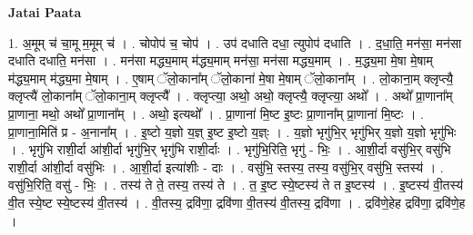 \documentclass[17pt]{extarticle}
\begin{document}
\textbf{Jatai Paata} \newline

1. अ॒मूम् च॑ चा॒मू म॒मूम् च॑ । . चोपोप॑ च॒ चोप॑ । . उप॑ दधाति दधा॒ त्युपोप॑ दधाति । . द॒धा॒ति॒ मन॑सा॒ मन॑सा दधाति दधाति॒ मन॑सा । . मन॑सा मद्ध्य॒माम् म॑द्ध्य॒माम् मन॑सा॒ मन॑सा मद्ध्य॒माम् । . म॒द्ध्य॒मा मे॒षा मे॒षाम् म॑द्ध्य॒माम् म॑द्ध्य॒मा मे॒षाम् । . ए॒षाम् ॅलो॒काना᳚म् ॅलो॒काना॑ मे॒षा मे॒षाम् ॅलो॒काना᳚म् । . लो॒काना॒म् क्लृप्त्यै॒ क्लृप्त्यै॑ लो॒काना᳚म् ॅलो॒काना॒म् क्लृप्त्यै᳚ । . क्लृप्त्या॒ अथो॒ अथो॒ क्लृप्त्यै॒ क्लृप्त्या॒ अथो᳚ । . अथो᳚ प्रा॒णाना᳚म् प्रा॒णाना॒ मथो॒ अथो᳚ प्रा॒णाना᳚म् । . अथो॒ इत्यथो᳚ । . प्रा॒णाना॑ मि॒ष्ट इ॒ष्टः प्रा॒णाना᳚म् प्रा॒णाना॑ मि॒ष्टः । . प्रा॒णाना॒मिति॑ प्र - अ॒नाना᳚म् । . इ॒ष्टो य॒ज्ञो य॒ज्ञ् इ॒ष्ट इ॒ष्टो य॒ज्ञ्ः । . य॒ज्ञो भृगु॑भि॒र् भृगु॑भिर् य॒ज्ञो य॒ज्ञो भृगु॑भिः । . भृगु॑भि राशी॒र्दा आ॑शी॒र्दा भृगु॑भि॒र् भृगु॑भि राशी॒र्दाः । . भृगु॑भि॒रिति॒ भृगु॑ - भिः॒ । . आ॒शी॒र्दा वसु॑भि॒र् वसु॑भि राशी॒र्दा आ॑शी॒र्दा वसु॑भिः । . आ॒शी॒र्दा इत्या॑शीः - दाः । . वसु॑भि॒ स्तस्य॒ तस्य॒ वसु॑भि॒र् वसु॑भि॒ स्तस्य॑ । . वसु॑भि॒रिति॒ वसु॑ - भिः॒ । . तस्य॑ ते ते॒ तस्य॒ तस्य॑ ते । . त॒ इ॒ष्ट स्ये॒ष्टस्य॑ ते त इ॒ष्टस्य॑ । . इ॒ष्टस्य॑ वी॒तस्य॑ वी॒त स्ये॒ष्ट स्ये॒ष्टस्य॑ वी॒तस्य॑ । . वी॒तस्य॒ द्रवि॑णा॒ द्रवि॑णा वी॒तस्य॑ वी॒तस्य॒ द्रवि॑णा । . द्रवि॑णे॒हेह द्रवि॑णा॒ द्रवि॑णे॒ह । \newline
\end{document}
